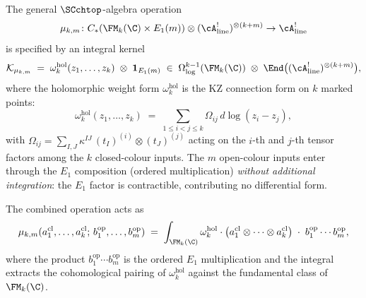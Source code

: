 \begin{computation}
\label{comp:general-kernel}
The general $\SCchtop$-algebra operation
\[
\mu_{k,m} \colon C_*(\FM_k(\C) \times E_1(m)) \otimes
(\cA^!_{\mathrm{line}})^{\otimes(k+m)} \to
\cA^!_{\mathrm{line}}
\]
is specified by an integral kernel
\begin{equation}\label{eq:general-kernel}
\mathcal{K}_{\mu_{k,m}}
\;=\;
\omega_k^{\mathrm{hol}}(z_1, \ldots, z_k)
\;\otimes\;
\mathbf{1}_{E_1(m)}
\;\in\;
\Omega^{k-1}_{\log}(\FM_k(\C))
\;\otimes\;
\End\bigl((\cA^!_{\mathrm{line}})^{\otimes(k+m)}\bigr),
\end{equation}
where the holomorphic weight form $\omega_k^{\mathrm{hol}}$ is
the KZ connection form on $k$ marked points:
\begin{equation}\label{eq:KZ-weight-form}
\omega_k^{\mathrm{hol}}(z_1, \ldots, z_k)
\;=\;
\sum_{1 \le i < j \le k}
\Omega_{ij}\,d\log(z_i - z_j),
\end{equation}
with
$\Omega_{ij} = \sum_{I,J}\kappa^{IJ}\,
(t_I)^{(i)} \otimes (t_J)^{(j)}$
acting on the $i$-th and $j$-th tensor factors among the
$k$ closed-colour inputs. The $m$ open-colour inputs
enter through the $E_1$ composition (ordered multiplication)
\emph{without additional integration}: the $E_1$ factor is
contractible, contributing no differential form.

The combined operation acts as
\begin{equation}\label{eq:mu-km-integral}
\mu_{k,m}(a_1^{\mathrm{cl}}, \ldots, a_k^{\mathrm{cl}};
 \, b_1^{\mathrm{op}}, \ldots, b_m^{\mathrm{op}})
\;=\;
\int_{\FM_k(\C)}
\omega_k^{\mathrm{hol}}
\cdot
\bigl(
 a_1^{\mathrm{cl}} \otimes \cdots \otimes a_k^{\mathrm{cl}}
\bigr)
\;\cdot\;
b_1^{\mathrm{op}} \cdots b_m^{\mathrm{op}},
\end{equation}
where the product $b_1^{\mathrm{op}} \cdots b_m^{\mathrm{op}}$
is the ordered $E_1$ multiplication and the integral extracts
the cohomological pairing of $\omega_k^{\mathrm{hol}}$
against the fundamental class of $\FM_k(\C)$.


\end{computation}
